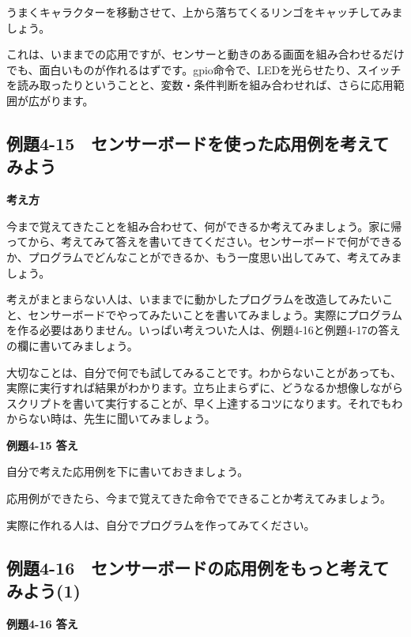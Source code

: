 \documentclass[a4paper,12pt]{jarticle}
\begin{document}
\bigskip
\bigskip
\bigskip

うまくキャラクターを移動させて、上から落ちてくるリンゴをキャッチしてみましょう。


\bigskip

これは、いままでの応用ですが、センサーと動きのある画面を組み合わせるだけでも、面白いものが作れるはずです。gpio命令で、LEDを光らせたり、スイッチを読み取ったりということと、変数・条件判断を組み合わせれば、さらに応用範囲が広がります。

\clearpage
\subsection{例題4-15　センサーボードを使った応用例を考えてみよう}
\bigskip
\bigskip

{\bfseries
考え方}

\bigskip

今まで覚えてきたことを組み合わせて、何ができるか考えてみましょう。家に帰ってから、考えてみて答えを書いてきてください。センサーボードで何ができるか、プログラムでどんなことができるか、もう一度思い出してみて、考えてみましょう。

考えがまとまらない人は、いままでに動かしたプログラムを改造してみたいこと、センサーボードでやってみたいことを書いてみましょう。実際にプログラムを作る必要はありません。いっぱい考えついた人は、例題4-16と例題4-17の答えの欄に書いてみましょう。


\bigskip

大切なことは、自分で何でも試してみることです。わからないことがあっても、実際に実行すれば結果がわかります。立ち止まらずに、どうなるか想像しながらスクリプトを書いて実行することが、早く上達するコツになります。それでもわからない時は、先生に聞いてみましょう。


\bigskip

{\bfseries
例題4-15 答え}


\bigskip

自分で考えた応用例を下に書いておきましょう。

応用例ができたら、今まで覚えてきた命令でできることか考えてみましょう。

実際に作れる人は、自分でプログラムを作ってみてください。


\clearpage
\subsection{例題4-16　センサーボードの応用例をもっと考えてみよう(1)}
\bigskip
\bigskip

{\bfseries
例題4-16 答え}
\end{document}
